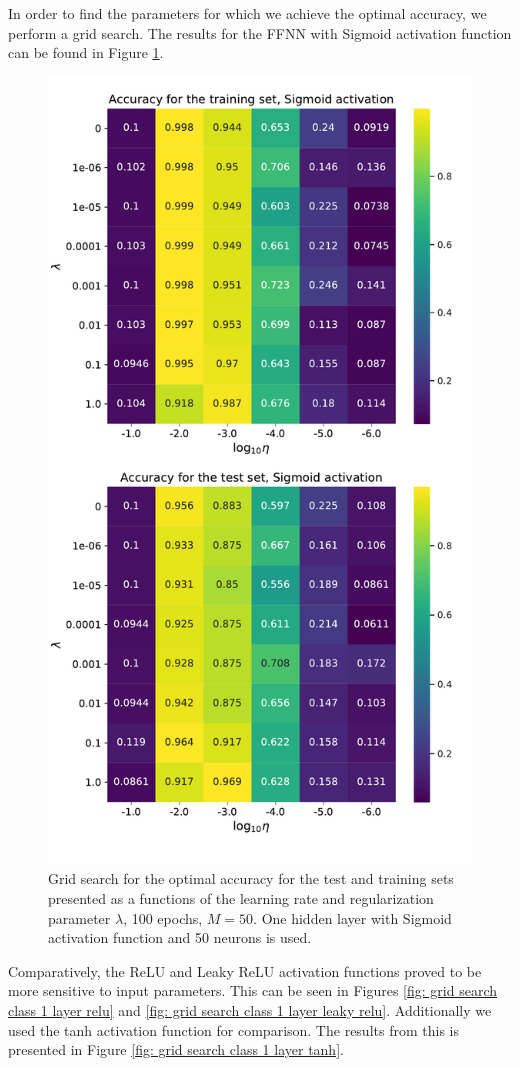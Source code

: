 \documentclass{emulateapj}
\begin{document}
In order to find the parameters for which we achieve the optimal accuracy, we perform a grid search. The results for the FFNN with Sigmoid activation function can be found in Figure \ref{fig: grid search class 1 layer}.

\begin{figure}[h]
    \centering
    \includegraphics[width=.49\textwidth]{Figures/Class_Ridge_1_layer.pdf}
    \caption{Grid search for the optimal accuracy for the test and training sets presented as a functions of the learning rate and regularization parameter $\lambda$, 100 epochs, $M=50$. One hidden layer with Sigmoid activation function and 50 neurons is used.}
    \label{fig: grid search class 1 layer}
\end{figure}

Comparatively, the ReLU and Leaky ReLU activation functions proved to be more sensitive to input parameters. This can be seen in Figures \ref{fig: grid search class 1 layer relu} and \ref{fig: grid search class 1 layer leaky relu}. Additionally we used the tanh activation function for comparison. The results from this is presented in Figure \ref{fig: grid search class 1 layer tanh}. 
\end{document}
